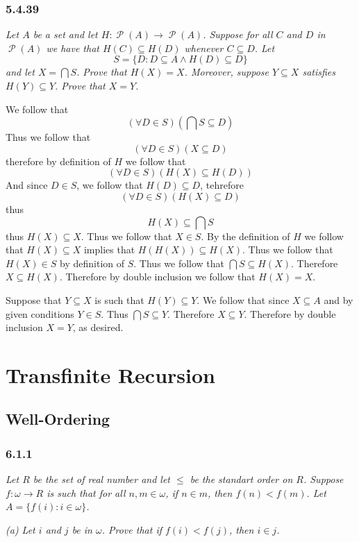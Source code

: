 \documentclass[11pt,oneside,titlepage]{book}
\DeclareMathOperator \pow {\mathcal {P}}
\begin{document}
\subsection*{5.4.39}

\textit{Let $A$ be a set and let $H: \pow(A) \to \pow(A)$. Suppose for all $C$ and $D$
  in $\pow(A)$ we have that $H(C) \subseteq H(D)$ whenever $C \subseteq D$.
  Let
  $$S = \{D: D \subseteq A \land H(D) \subseteq D\}$$
  and let $X = \bigcap{S}$. Prove that $H(X) = X$. Moreover, suppose $Y \subseteq X$
  satisfies $H(Y) \subseteq Y$. Prove that $X = Y$.}

We follow that
$$(\forall D \in S)(\bigcap{S} \subseteq D)$$
Thus we follow that
$$(\forall D \in S)(X \subseteq D)$$
therefore by definition of $H$ we follow that 
$$(\forall D \in S)(H(X) \subseteq H(D))$$
And since $D \in S$, we follow that $H(D) \subseteq D$, tehrefore
$$(\forall D \in S)(H(X) \subseteq D)$$
thus
$$H(X) \subseteq \bigcap{S}$$
thus $H(X) \subseteq X$. Thus we follow that $X \in S$. By the definition of $H$
we follow that $H(X) \subseteq X$ implies that $H(H(X)) \subseteq H(X)$. Thus
we follow that $H(X) \in S$ by definition of $S$. Thus we follow that
$\bigcap{S} \subseteq H(X)$. Therefore $X \subseteq H(X)$. Therefore by double inclusion
we follow that $H(X) = X$.

Suppose that $Y \subseteq X$ is such that $H(Y) \subseteq Y$. We follow that since
$X \subseteq A$ and by given conditions $Y \in S$. Thus $\bigcap{S} \subseteq Y$.
Therefore $X \subseteq Y$. Therefore by double inclusion $X = Y$, as desired.

\chapter{Transfinite Recursion}

\section{Well-Ordering}

\subsection*{6.1.1}

\textit{Let $R$ be the set of real number and let $\leq$ be the standart order on $R$.
  Suppose $f: \omega \to R$ is such that for all $n, m \in \omega$, if $n \in m$,
  then $f(n) < f(m)$. Let $A = \{f(i): i \in \omega\}$.}

\textit{(a) Let $i$ and $j$ be in $\omega$. Prove that if $f(i) < f(j)$, then
  $i \in j$.}
\end{document}
